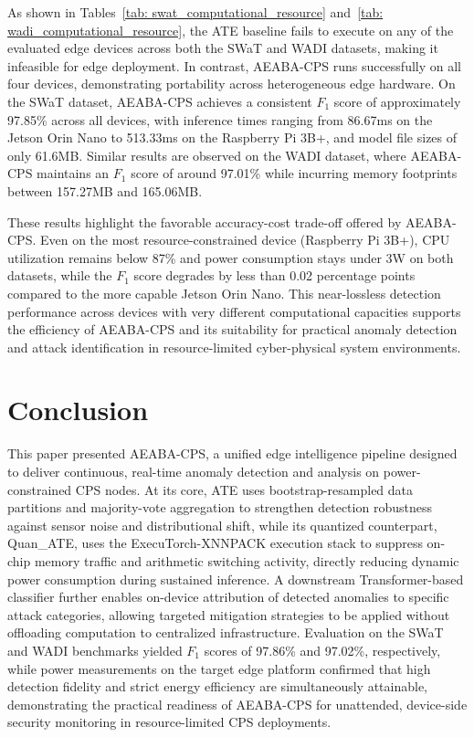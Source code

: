 \documentclass[pdflatex,sn-mathphys-num]{sn-jnl}
\theoremstyle{thmstyleone}
\theoremstyle{thmstyletwo}
\theoremstyle{thmstylethree}
\begin{document}
As shown in Tables~\ref{tab: swat_computational_resource} and~\ref{tab: wadi_computational_resource}, the ATE baseline fails to execute on any of the evaluated edge devices across both the SWaT and WADI datasets, making it infeasible for edge deployment. In contrast, AEABA-CPS runs successfully on all four devices, demonstrating portability across heterogeneous edge hardware. On the SWaT dataset, AEABA-CPS achieves a consistent $F_1$ score of approximately 97.85\% across all devices, with inference times ranging from 86.67ms on the Jetson Orin Nano to 513.33ms on the Raspberry Pi 3B+, and model file sizes of only 61.6MB. Similar results are observed on the WADI dataset, where AEABA-CPS maintains an $F_1$ score of around 97.01\% while incurring memory footprints between 157.27MB and 165.06MB.

These results highlight the favorable accuracy-cost trade-off offered by AEABA-CPS. Even on the most resource-constrained device (Raspberry Pi 3B+), CPU utilization remains below 87\% and power consumption stays under 3W on both datasets, while the $F_1$ score degrades by less than 0.02 percentage points compared to the more capable Jetson Orin Nano. This near-lossless detection performance across devices with very different computational capacities supports the efficiency of AEABA-CPS and its suitability for practical anomaly detection and attack identification in resource-limited cyber-physical system environments.





\section{Conclusion}
This paper presented AEABA-CPS, a unified edge intelligence pipeline designed to deliver continuous, real-time anomaly detection and analysis on power-constrained CPS nodes. At its core, ATE uses bootstrap-resampled data partitions and majority-vote aggregation to strengthen detection robustness against sensor noise and distributional shift, while its quantized counterpart, Quan\_ATE, uses the ExecuTorch-XNNPACK execution stack to suppress on-chip memory traffic and arithmetic switching activity, directly reducing dynamic power consumption during sustained inference. A downstream Transformer-based classifier further enables on-device attribution of detected anomalies to specific attack categories, allowing targeted mitigation strategies to be applied without offloading computation to centralized infrastructure. Evaluation on the SWaT and WADI benchmarks yielded $F_1$ scores of 97.86\% and 97.02\%, respectively, while power measurements on the target edge platform confirmed that high detection fidelity and strict energy efficiency are simultaneously attainable, demonstrating the practical readiness of AEABA-CPS for unattended, device-side security monitoring in resource-limited CPS deployments.



\end{document}
